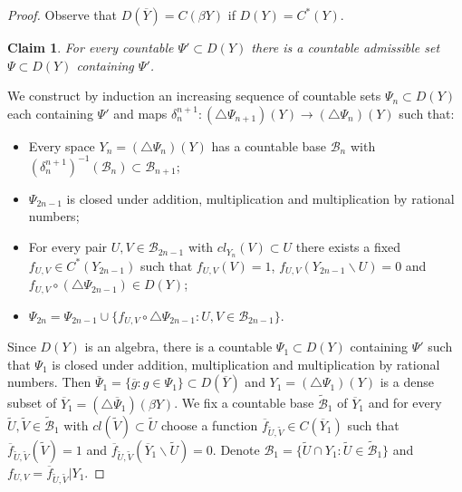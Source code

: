 \documentclass[10pt,a4paper]{amsart}
\newtheorem{claim}{Claim}
\begin{document}
\begin{proof} Observe that $D(\overline Y)=C(\beta Y)$ if $D(Y)=C^*(Y)$.
\begin{claim}
For every countable $\Psi'\subset D(Y)$ there is a countable admissible set $\Psi\subset D(Y)$ containing $\Psi'$.
\end{claim}
We construct by induction an increasing sequence of countable sets $\Psi_n\subset D(Y)$ each containing $\Psi'$ and maps 
$\delta^{n+1}_n:(\triangle\Psi_{n+1})(Y)\to(\triangle\Psi_{n})(Y)$ such that: 
\begin{itemize}
\item Every space $Y_n=(\triangle\Psi_{n})(Y)$ has a countable base $\mathcal B_n$ with $(\delta^{n+1}_n)^{-1}(\mathcal B_n)\subset\mathcal B_{n+1}$;
\item $\Psi_{2n-1}$ is closed under addition, multiplication and multiplication by rational numbers;
\item For every pair $U,V\in\mathcal B_{2n-1}$ with $cl_{Y_n}(V)\subset U$ there exists a  fixed $f_{U,V}\in C^*(Y_{2n-1})$ such that 
$f_{U,V}(V)=1$, $f_{U,V}(Y_{2n-1}\backslash U)=0$ and $f_{U,V}\circ(\triangle\Psi_{2n-1})\in D(Y)$; 
\item $\Psi_{2n}=\Psi_{2n-1}\cup\{f_{U,V}\circ\triangle\Psi_{2n-1}:U,V\in\mathcal B_{2n-1}\}$.
\end{itemize} 
Since $D(Y)$ is an algebra, there is a countable $\Psi_1\subset D(Y)$ containing $\Psi'$ such that $\Psi_1$ is closed under addition, multiplication and multiplication by rational numbers. Then 
$\overline\Psi_1=\{\overline g:g\in\Psi_1\}\subset D(\overline Y)$ and $Y_1=(\triangle\Psi_{1})(Y)$ is a dense subset of 
$\overline Y_1=(\triangle\overline\Psi_{1})(\beta Y)$. We fix a countable base $\widetilde{\mathcal B}_1$ of $\overline Y_1$ and for every $\widetilde U,\widetilde V\in\widetilde{\mathcal B}_1$ with $cl(\widetilde V)\subset\widetilde U$ choose  
a function $\overline f_{\widetilde U,\widetilde V}\in C(\overline Y_1)$ such that  
$\overline f_{\widetilde U,\widetilde V}(\widetilde V)=1$ and $\overline f_{\widetilde U,\widetilde V}(\overline Y_1\backslash \widetilde U)=0$.
Denote $\mathcal B_1=\{\widetilde U\cap Y_1:\widetilde U\in\widetilde{\mathcal B}_1\}$ and $f_{U,V}=\overline f_{\widetilde U,\widetilde V}|Y_1$.


\end{proof}
\end{document}
